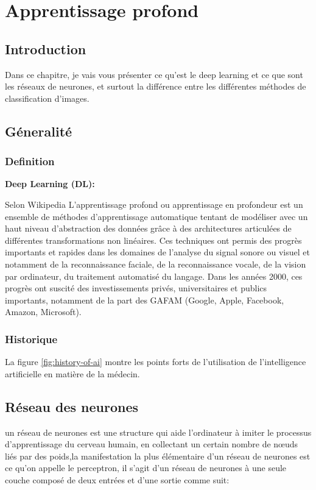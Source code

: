\chapter{Apprentissage profond}

\section*{Introduction}
    Dans ce chapitre, je vais vous présenter ce qu'est le deep learning et ce que sont les réseaux de neurones, et surtout la différence entre les différentes méthodes de classification d'images.
\section{Géneralité}
    \subsection{Definition}\textbf{Deep Learning (DL):} 
            
        Selon Wikipedia L'apprentissage profond ou apprentissage en profondeur est un ensemble de méthodes d'apprentissage automatique tentant de modéliser avec un haut niveau d’abstraction des données grâce à des architectures articulées de différentes transformations non linéaires. Ces techniques ont permis des progrès importants et rapides dans les domaines de l'analyse du signal sonore ou visuel et notamment de la reconnaissance faciale, de la reconnaissance vocale, de la vision par ordinateur, du traitement automatisé du langage. Dans les années 2000, ces progrès ont suscité des investissements privés, universitaires et publics importants, notamment de la part des GAFAM (Google, Apple, Facebook, Amazon, Microsoft).
    \subsection{Historique}
    La figure \ref{fig:history-of-ai} montre les points forts de  l'utilisation de l'intelligence artificielle en matière de la médecin.
\section{Réseau des neurones}
    un réseau de neurones est une structure qui aide l'ordinateur à imiter le processus d'apprentissage du cerveau humain, en collectant un certain nombre de nœuds liés par des poids,la manifestation la plus élémentaire d'un réseau de neurones est ce qu'on appelle le perceptron, il s'agit d'un réseau de neurones à une seule couche composé de deux entrées et d'une sortie comme suit:

